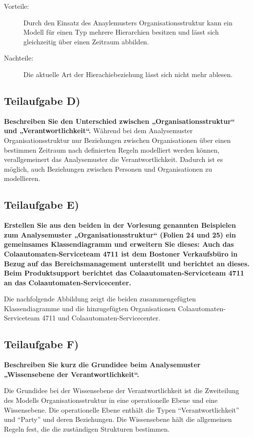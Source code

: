 \begin{description}
  \item[Vorteile:] Durch den Einsatz des Anaylemusters Organisationsstruktur
  kann ein Modell für einen Typ mehrere Hierarchien besitzen und lässt sich
  gleichzeitig über einen Zeitraum abbilden.
  \item[Nachteile:] Die aktuelle Art der Hierachiebeziehung lässt sich nicht
  mehr ablesen.
\end{description}


\subsection{Teilaufgabe D)}
\textbf{Beschreiben Sie den Unterschied zwischen „Organisationsstruktur“ und
„Verantwortlichkeit“.}
Während bei dem Analysemuster Organisationsstruktur nur Beziehungen zwischen
Organisationen über einen bestimmen Zeitraum nach definierten Regeln modelliert werden können,
verallgemeinert das Analysemuster die Verantwortlichkeit. Dadurch
ist es möglich, auch Beziehungen zwischen Personen und Organisationen zu
modellieren.


\subsection{Teilaufgabe E)}
\textbf{Erstellen Sie aus den beiden in der Vorlesung genannten Beispielen zum Analysemuster
„Organisationsstruktur“ (Folien 24 und 25) ein gemeinsames Klassendiagramm und
erweitern Sie dieses: Auch das Colaautomaten-Serviceteam 4711 ist dem Bostoner
Verkaufsbüro in Bezug auf das Bereichsmanagement unterstellt und berichtet an dieses.
Beim Produktsupport berichtet das Colaautomaten-Serviceteam 4711 an das
Colaautomaten-Servicecenter.}

Die nachfolgende Abbildung zeigt die beiden zusammengefügten Klassendiagramme
und die hinzugefügten Organisationen Colaautomaten-Serviceteam 4711 und
Colaautomaten-Servicecenter.


\subsection{Teilaufgabe F)}
\textbf{Beschreiben Sie kurz die Grundidee beim Analysemuster „Wissensebene der
Verantwortlichkeit“.}

Die Grundidee bei der Wissensebene der Verantwortlichkeit ist die Zweiteilung
des Modells Organisationsstruktur in eine operationelle Ebene und eine
Wissensebene. Die operationelle Ebene enthält die Typen "`Verantwortlichkeit"'
und "`Party"' und deren Beziehungen. Die Wissensebene hält die allgemeinen
Regeln fest, die die zuständigen Strukturen bestimmen.

\clearpage 